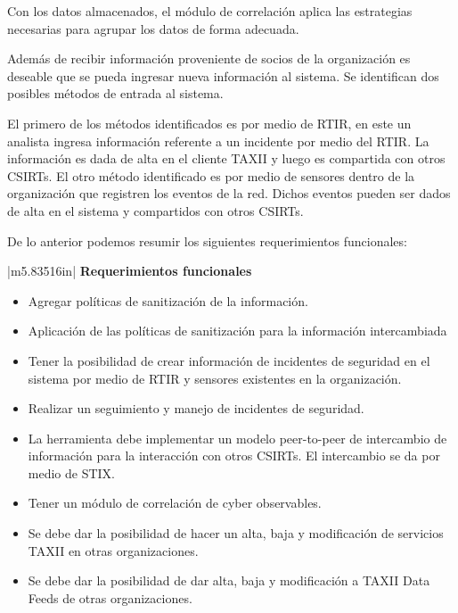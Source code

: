 \documentclass[11pt]{article}
\makeatletter
\newcommand\arraybslash{\let\\\@arraycr}
\makeatother
\begin{document}
Con los datos almacenados, el módulo de correlación aplica las estrategias necesarias para agrupar los datos de forma
adecuada.


\bigskip

Además de recibir información proveniente de socios de la organización es deseable que se pueda ingresar nueva
información al sistema. Se identifican dos posibles métodos de entrada al sistema.

El primero de los métodos identificados es por medio de RTIR, en este un analista ingresa información referente a un
incidente por medio del RTIR. La información es dada de alta en el cliente TAXII y luego es compartida con otros
CSIRTs. El otro método identificado es por medio de sensores dentro de la organización que registren los eventos de la
red. Dichos eventos pueden ser dados de alta en el sistema y compartidos con otros CSIRTs.


\bigskip

De lo anterior podemos resumir los siguientes requerimientos funcionales:


\bigskip

\begin{flushleft}
\tablefirsthead{}
\tablehead{}
\tabletail{}
\tablelasttail{}
\begin{supertabular}{|m{5.83516in}|}
\hline
\centering\arraybslash{\bfseries\color{black} Requerimientos funcionales}\\\hline
\liststyleWWNumii
\begin{itemize}
\item { Agregar políticas de sanitización de la información.}
\item { Aplicación de las políticas de sanitización para la información intercambiada}
\item { Tener la posibilidad de crear información de incidentes de seguridad en el sistema por
medio de RTIR y sensores existentes en la organización.}
\item { Realizar un seguimiento y manejo de incidentes de seguridad.}
\item { La herramienta debe implementar un modelo peer-to-peer de intercambio de información
para la interacción con otros CSIRTs. El intercambio se da por medio de STIX.}
\item { Tener un módulo de correlación de cyber observables.}
\item { Se debe dar la posibilidad de hacer un alta, baja y modificación de servicios TAXII en
otras organizaciones.}
\item { Se debe dar la posibilidad de dar alta, baja y modificación a TAXII Data Feeds de otras
organizaciones.}
\end{itemize}
\\\hline
\end{supertabular}
\end{flushleft}
\end{document}
